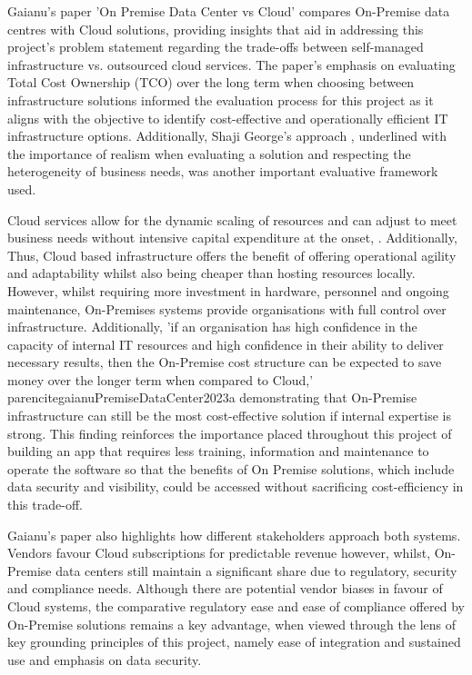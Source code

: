 \documentclass{report}
\begin{document}
Gaianu's paper 'On Premise Data Center vs Cloud' compares On-Premise data centres with Cloud solutions, providing insights that aid in addressing this project's problem statement regarding the trade-offs between self-managed infrastructure vs. outsourced cloud services.  The paper's emphasis on evaluating Total Cost Ownership (TCO) over the long term when choosing between infrastructure solutions \parencite{gaianuPremiseDataCenter2023a}  informed the evaluation process for this project as it aligns with the objective to identify cost-effective and operationally efficient IT infrastructure options. Additionally, Shaji George's approach \parencite{georgeCloudComedownUnderstanding2024}, underlined with the importance of realism when evaluating a solution and respecting the heterogeneity of business needs, was another important evaluative framework used. 
  
Cloud services allow for the dynamic scaling of resources and can adjust to meet business needs without intensive capital expenditure at the onset\parencite{gaianuPremiseDataCenter2023a}, \parencite{georgeCloudComedownUnderstanding2024}. Additionally, Thus, Cloud based infrastructure offers the benefit of offering operational agility and adaptability whilst also being cheaper than hosting resources locally. However, whilst requiring more investment in hardware, personnel and ongoing maintenance, On-Premises systems provide organisations with full control over infrastructure. Additionally, 'if an organisation has high confidence in the capacity of internal IT resources and high confidence in their ability to deliver necessary results, then the On-Premise cost structure can be expected to save money over the longer term when compared to Cloud,' parencite{gaianuPremiseDataCenter2023a} demonstrating that On-Premise infrastructure can still be the most cost-effective solution if internal expertise is strong. This finding reinforces the importance placed throughout this project of building an app that requires less training, information and maintenance to operate the software so that the benefits of On Premise solutions, which include data security and visibility, could be accessed without sacrificing cost-efficiency in this trade-off.

Gaianu's paper also highlights  how different stakeholders approach both systems. Vendors favour Cloud subscriptions for predictable revenue however, whilst, On-Premise data centers still maintain a significant share due to regulatory, security and compliance needs. Although there are potential vendor biases in favour of Cloud systems, the comparative regulatory ease and ease of compliance offered by On-Premise solutions remains a key advantage, when viewed through the lens of key grounding principles of this project, namely ease of integration and sustained use and emphasis on data security. 
\end{document}
